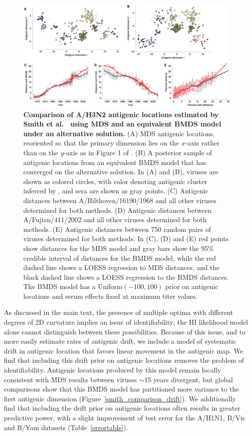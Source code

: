 \documentclass[11pt,oneside,letterpaper]{article}
\begin{document}
\begin{figure}[h]
	\centering		
	\includegraphics[width=1.0\textwidth]{figures/smith_comparison_rotation}
	\caption{\textbf{Comparison of A/H3N2 antigenic locations estimated by Smith et al.\ \cite{Smith04} using MDS and an equivalent BMDS model under an alternative solution.} 
	(A) MDS antigenic locations, reoriented so that the primary dimension lies on the $x$-axis rather than on the $y$-axis as in Figure 1 of \cite{Smith04}.
	(B) A posterior sample of antigenic locations from an equivalent BMDS model that has converged on the alternative solution.
	In (A) and (B), viruses are shown as colored circles, with color denoting antigenic cluster inferred by \cite{Smith04}, and sera are shown as gray points.
	(C) Antigenic distances between A/Bilthoven/16190/1968 and all other viruses determined for both methods.
	(D) Antigenic distances between A/Fujian/411/2002 and all other viruses determined for both methods.
	(E) Antigenic distances between 750 random pairs of viruses determined for both methods.	
	In (C), (D) and (E) red points show distances for the MDS model and gray bars show the 95\% credible interval of distances for the BMDS model, while the red dashed line shows a LOESS regression to MDS distances, and the black dashed line shows a LOESS regression to the BMDS distances.
	The BMDS model has a Uniform$(-100,100)$ prior on antigenic locations and serum effects fixed at maximum titer values. 	
	} 
	\label{smith_comparison_rotation} 
\end{figure}

As discussed in the main text, the presence of multiple optima with different degrees of 2D curvature implies an issue of identifiability; the HI likelihood model alone cannot distinguish between these possibilities.
Because of this issue, and to more easily estimate rates of antigenic drift, we include a model of systematic drift in antigenic location that favors linear movement in the antigenic map.
We find that including this drift prior on antigenic locations removes the problem of identifiability.
Antigenic locations produced by this model remain locally consistent with MDS results between viruses $\sim$15 years divergent, but global comparisons show that this BMDS model has partitioned more variance to the first antigenic dimension (Figure~\ref{smith_comparison_drift}).
We additionally find that including the drift prior on antigenic locations often results in greater predictive power, with a slight improvement of test error for the A/H1N1, B/Vic and B/Yam datasets (Table~\ref{errortable}).
\end{document}
